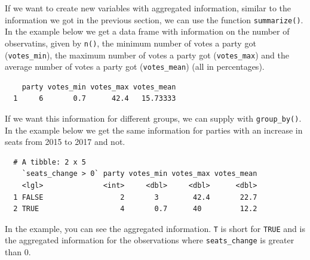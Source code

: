 \documentclass[12pt,oneside]{reedthesis}
\theoremstyle{definition}
\theoremstyle{definition}
\theoremstyle{definition}
\theoremstyle{remark}
\begin{document}
  If we want to create new variables with aggregated information, similar
  to the information we got in the previous section, we can use the
  function \texttt{summarize()}. In the example below we get a data frame
  with information on the number of observatins, given by \texttt{n()},
  the minimum number of votes a party got (\texttt{votes\_min}), the
  maximum number of votes a party got (\texttt{votes\_max}) and the
  average number of votes a party got (\texttt{votes\_mean}) (all in
  percentages).
  \begin{Shaded}
  \end{Shaded}
  \begin{verbatim}
    party votes_min votes_max votes_mean
  1     6       0.7      42.4   15.73333
  \end{verbatim}
  If we want this information for different groups, we can supply with
  \texttt{group\_by()}. In the example below we get the same information
  for parties with an increase in seats from 2015 to 2017 and not.
  \begin{Shaded}
  \end{Shaded}
  \begin{verbatim}
  # A tibble: 2 x 5
    `seats_change > 0` party votes_min votes_max votes_mean
    <lgl>              <int>     <dbl>     <dbl>      <dbl>
  1 FALSE                  2       3        42.4       22.7
  2 TRUE                   4       0.7      40         12.2
  \end{verbatim}
  In the example, you can see the aggregated information. \texttt{T} is
  short for \texttt{TRUE} and is the aggregated information for the
  observations where \texttt{seats\_change} is greater than 0.
  
\end{document}
